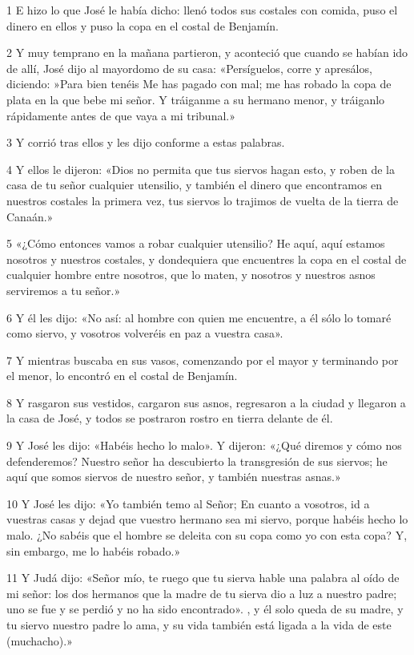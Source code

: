 \par 1 E hizo lo que José le había dicho: llenó todos sus costales con comida, puso el dinero en ellos y puso la copa en el costal de Benjamín.
\par 2 Y muy temprano en la mañana partieron, y aconteció que cuando se habían ido de allí, José dijo al mayordomo de su casa: «Persíguelos, corre y apresálos, diciendo: »Para bien tenéis Me has pagado con mal; me has robado la copa de plata en la que bebe mi señor. Y tráiganme a su hermano menor, y tráiganlo rápidamente antes de que vaya a mi tribunal.»
\par 3 Y corrió tras ellos y les dijo conforme a estas palabras.
\par 4 Y ellos le dijeron: «Dios no permita que tus siervos hagan esto, y roben de la casa de tu señor cualquier utensilio, y también el dinero que encontramos en nuestros costales la primera vez, tus siervos lo trajimos de vuelta de la tierra de Canaán.»
\par 5 «¿Cómo entonces vamos a robar cualquier utensilio? He aquí, aquí estamos nosotros y nuestros costales, y dondequiera que encuentres la copa en el costal de cualquier hombre entre nosotros, que lo maten, y nosotros y nuestros asnos serviremos a tu señor.»
\par 6 Y él les dijo: «No así: al hombre con quien me encuentre, a él sólo lo tomaré como siervo, y vosotros volveréis en paz a vuestra casa».
\par 7 Y mientras buscaba en sus vasos, comenzando por el mayor y terminando por el menor, lo encontró en el costal de Benjamín.
\par 8 Y rasgaron sus vestidos, cargaron sus asnos, regresaron a la ciudad y llegaron a la casa de José, y todos se postraron rostro en tierra delante de él.
\par 9 Y José les dijo: «Habéis hecho lo malo». Y dijeron: «¿Qué diremos y cómo nos defenderemos? Nuestro señor ha descubierto la transgresión de sus siervos; he aquí que somos siervos de nuestro señor, y también nuestras asnas.»
\par 10 Y José les dijo: «Yo también temo al Señor; En cuanto a vosotros, id a vuestras casas y dejad que vuestro hermano sea mi siervo, porque habéis hecho lo malo. ¿No sabéis que el hombre se deleita con su copa como yo con esta copa? Y, sin embargo, me lo habéis robado.»
\par 11 Y Judá dijo: «Señor mío, te ruego que tu sierva hable una palabra al oído de mi señor: los dos hermanos que la madre de tu sierva dio a luz a nuestro padre; uno se fue y se perdió y no ha sido encontrado». , y él solo queda de su madre, y tu siervo nuestro padre lo ama, y ​​su vida también está ligada a la vida de este (muchacho).»
